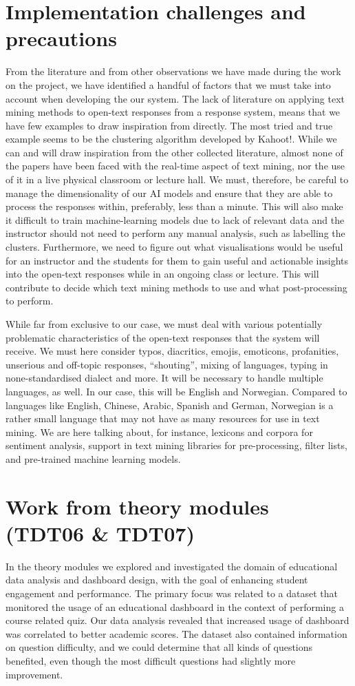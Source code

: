 \section{Implementation challenges and precautions}
From the literature and from other observations we have made during the work on the project, we have identified a handful of factors that we must take into account when developing the our system. The lack of literature on applying text mining methods to open-text responses from a response system, means that we have few examples to draw inspiration from directly. The most tried and true example seems to be the clustering algorithm developed by Kahoot!. While we can and will draw inspiration from the other collected literature, almost none of the papers have been faced with the real-time aspect of text mining, nor the use of it in a live physical classroom or lecture hall. We must, therefore, be careful to manage the dimensionality of our AI models and ensure that they are able to process the responses within, preferably, less than a minute. This will also make it difficult to train machine-learning models due to lack of relevant data and the instructor should not need to perform any manual analysis, such as labelling the clusters. Furthermore, we need to figure out what visualisations would be useful for an instructor and the students for them to gain useful and actionable insights into the open-text responses while in an ongoing class or lecture. This will contribute to decide which text mining methods to use and what post-processing to perform.

While far from exclusive to our case, we must deal with various potentially problematic characteristics of the open-text responses that the system will receive. We must here consider typos, diacritics, emojis, emoticons, profanities, unserious and off-topic responses, ``shouting'', mixing of languages, typing in none-standardised dialect and more. It will be necessary to handle multiple languages, as well. In our case, this will be English and Norwegian. Compared to languages like English, Chinese, Arabic, Spanish and German, Norwegian is a rather small language that may not have as many resources for use in text mining. We are here talking about, for instance, lexicons and corpora for sentiment analysis, support in text mining libraries for pre-processing, filter lists, and pre-trained machine learning models.

\section{Work from theory modules (TDT06 \& TDT07)}
In the theory modules we explored and investigated the domain of educational data analysis and dashboard design, with the goal of enhancing student engagement and performance. The primary focus was related to a dataset that monitored the usage of an educational dashboard in the context of performing a course related quiz. Our data analysis revealed that increased usage of dashboard was correlated to better academic scores. The dataset also contained information on question difficulty, and we could determine that all kinds of questions benefited, even though the most difficult questions had slightly more improvement.

